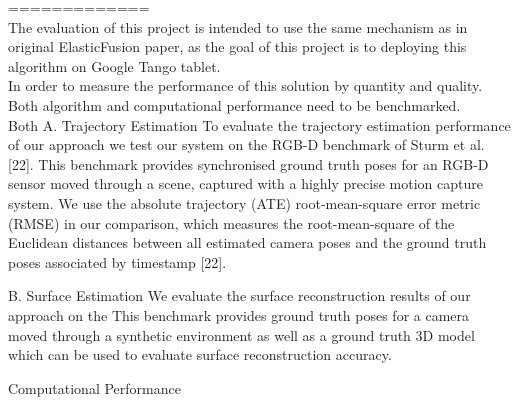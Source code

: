 \documentclass[12pt,twoside]{article}
\begin{document}
=============\\


The evaluation of this project is intended to use the same mechanism as in original ElasticFusion\citep{whelan2016elasticfusion} paper, as the goal of this project is to deploying this algorithm on Google Tango tablet.\\
In order to measure the performance of this solution by quantity and quality. Both algorithm and computational performance need to be benchmarked.\\
Both 
A. Trajectory Estimation
To evaluate the trajectory estimation performance of our approach
we test our system on the RGB-D benchmark of Sturm
et al. [22]. This benchmark provides synchronised ground truth
poses for an RGB-D sensor moved through a scene, captured
with a highly precise motion capture system.  We use the absolute
trajectory (ATE) root-mean-square error metric (RMSE) in
our comparison, which measures the root-mean-square of the
Euclidean distances between all estimated camera poses and
the ground truth poses associated by timestamp [22].
 
 
B. Surface Estimation
We evaluate the surface reconstruction results of our approach
on the 
 This
benchmark provides ground truth poses for a camera moved
through a synthetic environment as well as a ground truth 3D
model which can be used to evaluate surface reconstruction
accuracy. 

Computational Performance
\end{document}
